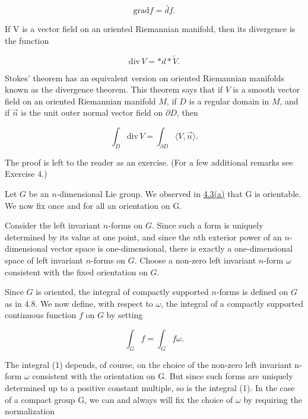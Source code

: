 \begin{equation}
\tag{9}\label{eq:4.10:9}
\mathrm{grad}f=\widetilde{df}.
\end{equation}

If V is a vector field on an oriented Riemannian manifold, then its divergence is the function

\begin{equation}
\tag{10}\label{eq:4.10:10}
\mathrm{div}\,V=*d*\tilde{V}.
\end{equation}

Stokes' theorem has an equivalent version on oriented Riemannian manifolds known as the divergence theorem. This theorem says that if $V$ is a smooth vector field on an oriented Riemannian manifold $M$, if $D$ is a regular domain in $M$, and if $\vec{n}$ is the unit outer normal vector field on $\partial D$, then 

\begin{equation}
\tag{11}\label{eq:4.10:11}
\int_{D}\mathrm{div}\,V=\int_{\partial D}\langle V,\vec{n}\rangle.
\end{equation}

The proof is left to the reader as an exercise. (For a few additional remarks see Exercise 4.)

\label{thm:4.11}
Let $G$ be an $n$-dimensional Lie group. We observed in \hyperref[thm:4.3]{4.3(a)} that G is orientable. We now fix once and for all an orientation on G.

Consider the left invariant $n$-forms on $G$. Since such a form is uniquely determined by its value at one point, and since the $n$th exterior power of an $n$-dimensional vector space is one-dimensional, there is exactly a one-dimensional space of left invariant $n$-forms on $G$. Choose a non-zero left invariant $n$-form $\omega$ consistent with the fixed orientation on $G$.

Since $G$ is oriented, the integral of compactly supported $n$-forms is defined on $G$ as in 4.8. We now define, with respect to $\omega$, the integral of a compactly supported continuous function $f$ on $G$ by setting

\begin{equation}
\tag{1}\label{eq:4.11:1}
\int_{G}f=\int_{G}f\omega.
\end{equation}

The integral (1) depends, of course, on the choice of the non-zero left invariant n-form  $ \omega $ consistent with the orientation on G. But since such forms are uniquely determined up to a positive constant multiple, so is the integral (1). In the case of a compact group G, we can and always will fix the choice of  $ \omega $ by requiring the normalization

